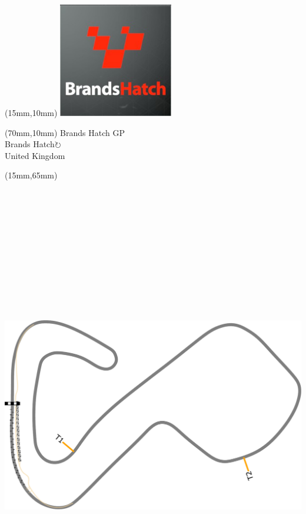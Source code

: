 \null\newpage
\begin{textblock*}{50mm}(15mm,10mm)%
\includegraphics[width=50mm]{LG/2015-05-20_00074.png}
\end{textblock*}
\begin{textblock*}{130mm}(70mm,10mm)%
{\fontsize{20}{20}\selectfont Brands Hatch GP\\}
{\fontsize{16}{16}\selectfont Brands Hatch\hfill \Large$\circlearrowright$\\}
{\fontsize{12}{12}\selectfont United Kingdom\\}
\end{textblock*}
\begin{textblock*}{185mm}(15mm,65mm)%
\centering
\mbox{\includegraphics[width=185mm,height=210mm,keepaspectratio]{PT/BRHAGP.pdf}}
\end{textblock*}
